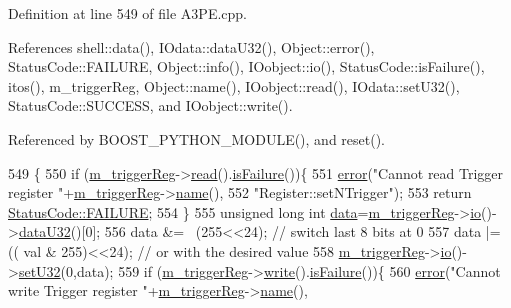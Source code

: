 Definition at line 549 of file A3\+P\+E.\+cpp.



References shell\+::data(), I\+Odata\+::data\+U32(), Object\+::error(), Status\+Code\+::\+F\+A\+I\+L\+U\+RE, Object\+::info(), I\+Oobject\+::io(), Status\+Code\+::is\+Failure(), itos(), m\+\_\+trigger\+Reg, Object\+::name(), I\+Oobject\+::read(), I\+Odata\+::set\+U32(), Status\+Code\+::\+S\+U\+C\+C\+E\+SS, and I\+Oobject\+::write().



Referenced by B\+O\+O\+S\+T\+\_\+\+P\+Y\+T\+H\+O\+N\+\_\+\+M\+O\+D\+U\+L\+E(), and reset().


\begin{DoxyCode}
549                                             \{
550   \textcolor{keywordflow}{if} (\hyperlink{classA3PE_a750158ae488121ab7969452f061e678c}{m\_triggerReg}->\hyperlink{classIOobject_aa07610c11963b1db6710e3c76ceea456}{read}().\hyperlink{classStatusCode_a5dd22dc6eb2c52fc4cabc58f6dea2eb7}{isFailure}())\{
551     \hyperlink{classObject_a204a95f57818c0f811933917a30eff45}{error}(\textcolor{stringliteral}{"Cannot read Trigger register "}+\hyperlink{classA3PE_a750158ae488121ab7969452f061e678c}{m\_triggerReg}->\hyperlink{classObject_a300f4c05dd468c7bb8b3c968868443c1}{name}(),
552         \textcolor{stringliteral}{"Register::setNTrigger"});
553     \textcolor{keywordflow}{return} \hyperlink{classStatusCode_a6f565cbeadc76d14c72f047e5e85eb4ba3da73d4c469762eb9d3c960368252b26}{StatusCode::FAILURE};
554   \}
555   \textcolor{keywordtype}{unsigned} \textcolor{keywordtype}{long} \textcolor{keywordtype}{int} \hyperlink{namespaceshell_a5ea2525995cedc3efd69ea8a7f034d1e}{data}=\hyperlink{classA3PE_a750158ae488121ab7969452f061e678c}{m\_triggerReg}->\hyperlink{classIOobject_af04fb94137c3d86849f478ac5afab5d1}{io}()->\hyperlink{classIOdata_ab0e3cd09f46c1c3712f797116f6da074}{dataU32}()[0];
556   data &= ~(255<<24); \textcolor{comment}{// switch last 8 bits at 0}
557   data |= (( val & 255)<<24);  \textcolor{comment}{// or with the desired value}
558   \hyperlink{classA3PE_a750158ae488121ab7969452f061e678c}{m\_triggerReg}->\hyperlink{classIOobject_af04fb94137c3d86849f478ac5afab5d1}{io}()->\hyperlink{classIOdata_abbed9a057203bc763f97b85fb385f36b}{setU32}(0,data);
559   \textcolor{keywordflow}{if} (\hyperlink{classA3PE_a750158ae488121ab7969452f061e678c}{m\_triggerReg}->\hyperlink{classIOobject_a9f6984bc9f0fadcf800f1be2523ac744}{write}().\hyperlink{classStatusCode_a5dd22dc6eb2c52fc4cabc58f6dea2eb7}{isFailure}())\{
560     \hyperlink{classObject_a204a95f57818c0f811933917a30eff45}{error}(\textcolor{stringliteral}{"Cannot write Trigger register "}+\hyperlink{classA3PE_a750158ae488121ab7969452f061e678c}{m\_triggerReg}->\hyperlink{classObject_a300f4c05dd468c7bb8b3c968868443c1}{name}(),

\end{DoxyCode}
